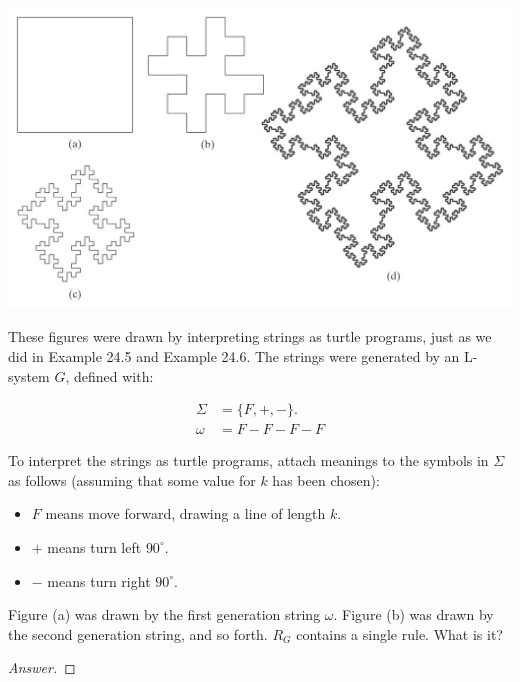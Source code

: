 \documentclass[10pt]{article}
\begin{document}
\begin{enumerate}[1)]
\includegraphics[scale=.4]{images/p8.png}

These figures were drawn by interpreting strings as turtle programs, just as we did in Example 24.5 and Example 24.6.  The strings were generated by an L-system $G$, defined with:

\begin{align*}
\Sigma &= \{F, +, -\}.\\
\omega &= F - F - F - F
\end{align*}

To interpret the strings as turtle programs, attach meanings to the symbols in $\Sigma$ as follows (assuming that some value for $k$ has been chosen):
\begin{itemize}
\item
$F$ means move forward, drawing a line of length $k$.
\item
$+$ means turn left $90^\circ$.
\item
$-$ means turn right $90^\circ$.
\end{itemize}

Figure (a) was drawn by the first generation string $\omega$.  Figure (b) was drawn by the second generation string, and so forth.  $R_G$ contains a single rule.  What is it?
\begin{proof}[Answer]
\end{proof}
\end{enumerate}
\end{document}
